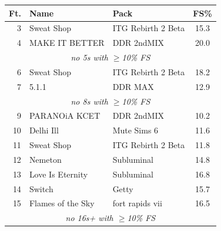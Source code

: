 \documentclass[10pt]{sigplanconf}
\begin{document}
\begin{figure}[t]
	\begin{center}
		\small
	\begin{tabular}{r|l|l|c}
		\bf Ft. & \bf Name & \bf Pack & \bf FS\% \\
		\hline
		 3 & Sweat Shop       & ITG Rebirth 2 Beta    & 15.3 \\
		 4 & MAKE IT BETTER   & DDR 2ndMIX            & 20.0 \\
		\multicolumn{4}{c}{\em no 5s with $\ge$10\% FS} \\
		 6 & Sweat Shop       & ITG Rebirth 2 Beta    & 18.2 \\
		 7 & 5.1.1            & DDR MAX               & 12.9 \\
		\multicolumn{4}{c}{\em no 8s with $\ge$10\% FS} \\
		 9 & PARANOiA KCET    & DDR 2ndMIX            & 10.2 \\
		10 & Delhi Ill        & Mute Sims 6           & 11.6 \\
		11 & Sweat Shop       & ITG Rebirth 2 Beta    & 11.8 \\
		12 & Nemeton          & Subluminal            & 14.8 \\
		13 & Love Is Eternity & Subluminal            & 16.8 \\
		14 & Switch           & Getty                 & 15.7 \\
		15 & Flames of the Sky & fort rapids vii      & 16.5 \\
		\multicolumn{4}{c}{\em no 16s+ with $\ge$10\% FS} \\

\end{tabular}
\end{center}
\end{figure}
\end{document}
